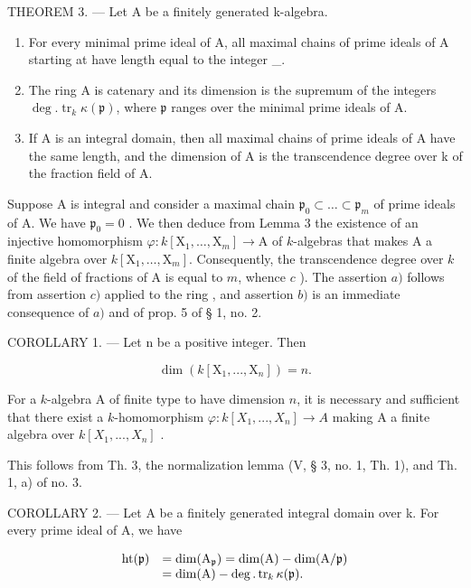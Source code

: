 THEOREM 3. — Let A be a finitely generated k-algebra.

\begin{enumerate}
\def\labelenumi{\alph{enumi})}
\item
  For every minimal prime ideal  of A, all maximal chains of prime ideals of A starting at  have length equal to the integer \_.
\item
  The ring A is catenary and its dimension is the supremum of the integers \(\deg. \operatorname{tr}_{k}\kappa(\mathfrak{p})\), where \(\mathfrak{p}\) ranges over the minimal prime ideals of A.
\item
  If A is an integral domain, then all maximal chains of prime ideals of A have the same length, and the dimension of A is the transcendence degree over k of the fraction field of A.
\end{enumerate}

Suppose A is integral and consider a maximal chain \(\mathfrak{p}_0 \subset \ldots \subset \mathfrak{p}_m\) of prime ideals of A. We have \(\mathfrak{p}_0 = 0\) . We then deduce from Lemma 3 the existence of an injective homomorphism \(\varphi : k[\mathrm{X}_1, \ldots, \mathrm{X}_m] \to \mathrm{A}\) of \(k\)-algebras that makes A a finite algebra over \(k[\mathrm{X}_1, \ldots, \mathrm{X}_m]\). Consequently, the transcendence degree over \(k\) of the field of fractions of A is equal to \(m\), whence \(c\) ). The assertion \(a)\) follows from assertion \(c)\) applied to the ring , and assertion \(b)\) is an immediate consequence of \(a)\) and of prop. 5 of § 1, no. 2.

COROLLARY 1. --- Let n be a positive integer. Then

\[
\dim (k [ \mathrm{X} _ {1},..., \mathrm{X} _ {n} ]) = n.
\]

For a \(k\)-algebra A of finite type to have dimension \(n\), it is necessary and sufficient that there exist a \(k\)-homomorphism \(\varphi: k[X_1, ..., X_n] \to A\) making A a finite algebra over \(k[X_1, ..., X_n]\) .

This follows from Th. 3, the normalization lemma (V, § 3, no. 1, Th. 1), and Th. 1, a) of no. 3.

COROLLARY 2. --- Let A be a finitely generated integral domain over k. For every prime ideal  of A, we have

\[
\begin{array}{r l} \mathrm{ht} (\mathfrak {p}) & = \dim (\mathrm{A} _ {\mathfrak {p}}) = \dim (\mathrm{A}) - \dim (\mathrm{A} / \mathfrak {p}) \\ & = \dim (\mathrm{A}) - \deg . \operatorname{tr} _ {k} \kappa (\mathfrak {p}). \end{array}
\]

